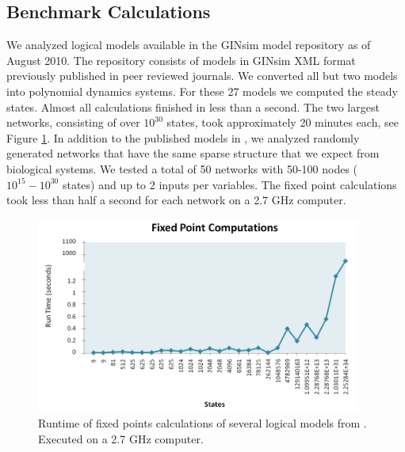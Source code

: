 \documentclass[11pt]{amsart}
\begin{document}
\subsection{Benchmark Calculations}
We analyzed logical models
available in the GINsim model repository \cite{GINsimRepo} as of August 2010. The
repository consists of models in GINsim XML format previously published in
peer reviewed journals. We converted all but two models into polynomial
dynamics systems. For these 27 models we computed the steady states. Almost all
calculations finished in less than a second. The two largest networks,
consisting of over $10^{30}$ states, took approximately 20 minutes each, see
Figure \ref{fig:chart}.
In addition to the published models in \cite{GINsimRepo}, we analyzed
randomly generated networks
that have the same sparse structure that we
expect from biological systems. We tested a total of 50 networks with
50-100 nodes ($10^{15} - 10^{30}$ states) and up to 2 inputs per variables. The
fixed point calculations took less than half a second for each network on
a 2.7 GHz computer.
\begin{figure}[htb]
\centering
\includegraphics[width=0.95\textwidth]{GINSimChart.png}
\caption{Runtime of fixed points calculations of several logical models from
\cite{GINsimRepo}. Executed on a 2.7 GHz computer.}
\label{fig:chart}
\end{figure}
 
\end{document}
